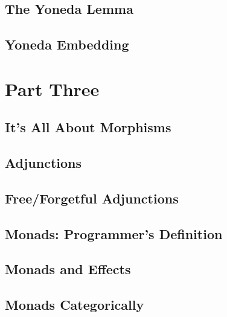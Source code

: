 \chapter{The Yoneda Lemma}\label{the-yoneda-lemma}


\chapter{Yoneda Embedding}\label{yoneda-embedding}


\part*{Part Three}

\chapter{It's All About Morphisms}\label{all-about-morphisms}


\chapter{Adjunctions}\label{adjunctions}


\chapter{Free/Forgetful Adjunctions}\label{free-forgetful-adjunctions}


\chapter{Monads: Programmer's Definition}\label{monads-programmers-definition}


\chapter{Monads and Effects}\label{monads-and-effects}


\chapter{Monads Categorically}\label{monads-categorically}


